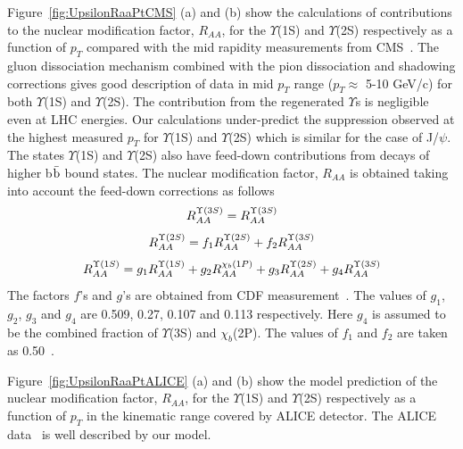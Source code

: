 \documentclass[12pt,a4paper,final]{iopart} %
\begin{document}
Figure~\ref{fig:UpsilonRaaPtCMS} (a) and (b) show the calculations of contributions to
the nuclear modification factor, $R_{AA}$, for the $\Upsilon$(1S) and $\Upsilon$(2S)
respectively as a function of $p_T$ compared with the mid rapidity measurements from
CMS~\cite{CMS:2017ucd}.  
The gluon dissociation mechanism combined with the pion dissociation and shadowing
corrections gives good description of data in mid $p_{T}$ range ($p_{T}\approx$ 5-10 GeV/c)
for both $\Upsilon$(1S) and $\Upsilon$(2S).
The contribution from the regenerated $\Upsilon$s is negligible even at LHC energies.
Our calculations under-predict the suppression observed at the highest measured
$p_{T}$ for $\Upsilon$(1S) and $\Upsilon$(2S) which is similar for the case
of J/$\psi$.
The states $\Upsilon$(1S) and $\Upsilon$(2S) also have
feed-down contributions from decays of higher b$\bar{\rm b}$ bound states.
The nuclear modification factor, $R_{AA}$ is obtained taking into account the feed-down corrections as follows
  \begin{equation}
    R_{AA}^{\Upsilon(3S)} = R_{AA}^{\Upsilon(3S)}\\ %
  \end{equation}
  \begin{equation}
    R_{AA}^{\Upsilon(2S)} = f_1 R_{AA}^{\Upsilon(2S)} +  f_2 R_{AA}^{\Upsilon(3S)} \\ %
  \end{equation}
   \begin{equation}
    R_{AA}^{\Upsilon(1S)} = g_1 R_{AA}^{\Upsilon(1S)} +  g_2 R_{AA}^{\chi_b(1P)} + g_3 R_{AA}^{\Upsilon(2S)} + g_4 R_{AA}^{\Upsilon(3S)}\\ %
  \end{equation}
The factors $f$’s and $g$’s are obtained from CDF measurement~\cite{Affolder:1999wm}.
The values of $g_1$, $g_2$, $g_3$ and $g_4$ are 0.509, 0.27, 0.107
and 0.113 respectively. Here $g_4$ is assumed to be the combined fraction of 
$\Upsilon$(3S) and $\chi_b$(2P).
The values of $f_1$ and $f_2$ are taken as 0.50~\cite{Strickland:2011aa}.


Figure~\ref{fig:UpsilonRaaPtALICE} (a) and (b) show the model 
prediction of the nuclear modification factor, $R_{AA}$, for the $\Upsilon$(1S)
and $\Upsilon$(2S) respectively as a function of $p_T$ in the kinematic range
covered by ALICE detector. The ALICE data~\cite{ALICE:Y5TeV} is well described by our model.
\end{document}
